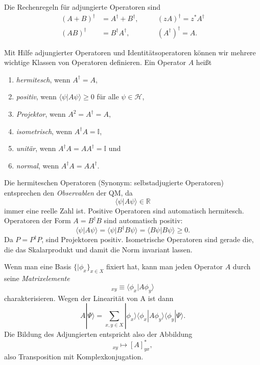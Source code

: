 Die Rechenregeln für adjungierte Operatoren sind
\begin{align}
	(A+B)^\dag &= A^\dag + B^\dag,  & \quad & (zA)^\dag = z^* A^\dag \\
	(AB)^\dag &= B^\dag A^\dag,  & \quad & (A^\dag)^\dag = A.
\end{align}

Mit Hilfe adjungierter Operatoren und Identitätsoperatoren können wir mehrere wichtige Klassen von Operatoren definieren. Ein Operator $A$ heißt
\begin{enumerate}
	\item \emph{hermitesch}, wenn $A^\dag = A$,
	\item \emph{positiv}, wenn $\langle \psi|A\psi\rangle \ge 0$ für alle $\psi \in \mathcal{H}$,
	\item \emph{Projektor}, wenn $A^2 = A^\dag = A$,
	\item \emph{isometrisch}, wenn $A^\dag A = \mathbb{I}$,
	\item \emph{unitär}, wenn $A^\dag A = AA^\dag = \mathbb{I}$ und
	\item \emph{normal}, wenn $A^\dag A = AA^\dag$.
\end{enumerate}
Die hermiteschen Operatoren (Synonym: selbstadjugierte Operatoren) entsprechen den \emph{Observablen} der QM, da 
\begin{equation}
	\langle \psi|A\psi\rangle \in \mathbb{R}
\end{equation}
immer eine reelle Zahl ist. Positive Operatoren sind automatisch hermitesch. Operatoren der Form $A = B^\dag B$ sind automatisch positiv:
\begin{equation}
	\langle \psi|A\psi\rangle = \langle \psi|B^\dag B\psi\rangle = \langle B\psi| B\psi\rangle \ge 0.
\end{equation}
Da $P = P^\dag P$, sind Projektoren positiv. Isometrische Operatoren sind gerade die, die das Skalarprodukt und damit die Norm invariant lassen.

Wenn man eine Basis $\{|\phi_x\}_{x\in X}$ fixiert hat, kann man jeden Operator $A$ durch seine \emph{Matrixelemente}
\begin{equation}
	[A]_{xy} \equiv \langle \phi_x|A\phi_y\rangle
\end{equation}
charakterisieren. Wegen der Linearität von A ist dann
\begin{equation}\label{eq:completenessA}
	A|\Psi\rangle = \sum_{x,y\in X} |\phi_x\rangle \langle \phi_x|A\phi_y\rangle \langle\phi_y|\Psi\rangle.
\end{equation}
Die Bildung des Adjungierten entspricht also der Abbildung 
\begin{equation}
	[A]_{xy} \mapsto [A]_{yx}^*,
\end{equation}
also Transposition mit Komplexkonjugation.


